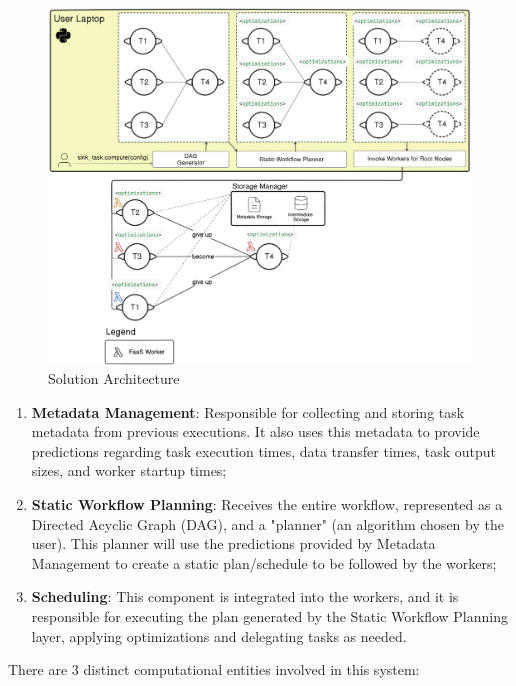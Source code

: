 \documentclass[conference]{IEEEtran}
\begin{document}
\begin{figure}[h]
  \centering
  \includegraphics[width=\columnwidth]{figures/solution_distributedarchintegrated.png}
  \caption{Solution Architecture}
  \label{fig:solution_architecture}
\end{figure}

\begin{enumerate}
    \item \textbf{Metadata Management}: Responsible for collecting and storing task metadata from previous executions. It also uses this metadata to provide predictions regarding task execution times, data transfer times, task output sizes, and worker startup times;
    \item \textbf{Static Workflow Planning}: Receives the entire workflow, represented as a Directed Acyclic Graph (DAG), and a "planner" (an algorithm chosen by the user). This planner will use the predictions provided by Metadata Management to create a static plan/schedule to be followed by the workers;
    \item \textbf{Scheduling}: This component is integrated into the workers, and it is responsible for executing the plan generated by the Static Workflow Planning layer, applying optimizations and delegating tasks as needed.
\end{enumerate}

There are 3 distinct computational entities involved in this system:
\end{document}
